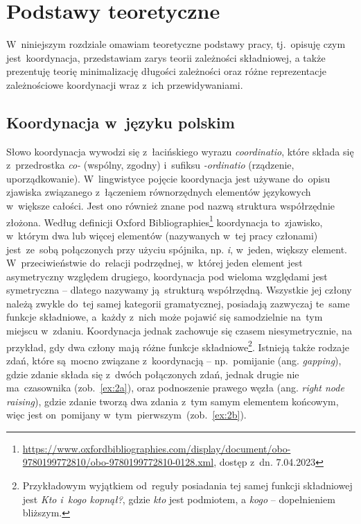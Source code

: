 \documentclass[licencjacka]{pracamgr_Kogni}
\begin{document}
    \chapter{Podstawy teoretyczne}\label{ch:podstawy-teoretyczne}
    W~niniejszym rozdziale omawiam teoretyczne podstawy pracy, tj.~opisuję czym jest~koordynacja, przedstawiam zarys teorii zależności składniowej, a także prezentuję teorię minimalizację długości zależności oraz różne reprezentacje zależnościowe koordynacji wraz z~ich przewidywaniami.


    \section{Koordynacja w~języku polskim}\label{sec:koordynacja-wjezyku-polskim}
    Słowo koordynacja wywodzi się z~łacińskiego wyrazu \textit{coordinatio}, które składa się z~przedrostka \textit{co-} (wspólny, zgodny) i~sufiksu \textit{-ordinatio} (rządzenie, uporządkowanie).
    W~lingwistyce pojęcie koordynacja jest używane do~opisu zjawiska związanego z~łączeniem równorzędnych elementów językowych w~większe całości.
    Jest ono również znane pod nazwą struktura współrzędnie złożona.
    Według definicji Oxford Bibliographies\footnote{\url{https://www.oxfordbibliographies.com/display/document/obo-9780199772810/obo-9780199772810-0128.xml}, dostęp z~dn. 7.04.2023} koordynacja to~zjawisko, w~którym dwa lub więcej elementów (nazywanych w~tej pracy członami) jest~ze~sobą połączonych przy użyciu spójnika, np. \textit{i}, w~jeden, większy element.
    W~przeciwieństwie do~relacji podrzędnej, w~której jeden element jest asymetryczny względem drugiego, koordynacja pod wieloma względami jest symetryczna -- dlatego nazywamy ją~strukturą współrzędną.
    Wszystkie jej człony należą zwykle do~tej samej kategorii gramatycznej, posiadają zazwyczaj te~same funkcje składniowe, a~każdy z~nich może pojawić się samodzielnie na~tym miejscu w~zdaniu.
    Koordynacja jednak zachowuje się czasem niesymetrycznie, na przykład, gdy dwa człony mają różne funkcje składniowe\footnote{Przykładowym wyjątkiem od~reguły posiadania tej samej funkcji składniowej jest \textit{Kto i~kogo kopnął?}, gdzie \textit{kto} jest podmiotem, a \textit{kogo} -- dopełnieniem bliższym.}.
    Istnieją także rodzaje zdań, które są~mocno związane z~koordynacją -- np.~pomijanie (ang. \textit{gapping}), gdzie zdanie składa się z~dwóch połączonych zdań, jednak drugie nie ma~czasownika (zob.~\ref{ex:2a}), oraz podnoszenie prawego węzła (ang. \textit{right node raising}), gdzie zdanie tworzą dwa zdania z~tym samym elementem końcowym, więc jest on~pomijany w~tym~pierwszym~(zob.~\ref{ex:2b}).
\end{document}
